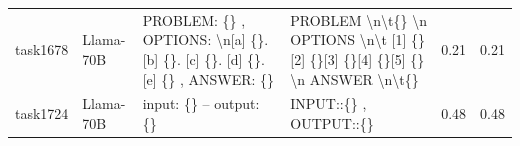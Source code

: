 \begin{longtable}{@{}p{0.8cm\tiny}p{1cm\tiny}p{4.1cm\ttfamily\tiny}p{4.1cm\ttfamily\tiny}p{0.8cm\tiny}p{0.8cm\tiny}@{}}
task1678  & Llama-70B  & PROBLEM: \{\} , OPTIONS: \textbackslash{}n{[}a{]} \{\}. {[}b{]} \{\}. {[}c{]} \{\}. {[}d{]} \{\}. {[}e{]} \{\} , ANSWER: \{\}                                                                                                                                                                                                                                                                                                                                                                                           & PROBLEM \textbackslash{}n\textbackslash{}t\{\} \textbackslash{}n OPTIONS \textbackslash{}n\textbackslash{}t {[}1{]} \{\}{[}2{]} \{\}{[}3{]} \{\}{[}4{]} \{\}{[}5{]} \{\} \textbackslash{}n ANSWER \textbackslash{}n\textbackslash{}t\{\}                                                                                                                                                                                                                                                                                                                                          & 0.21 & 0.21 \\
task1724  & Llama-70B  & input: \{\} -- output: \{\}                                                                                                                                                                                                                                                                                                                                                                                                                                                                                             & INPUT::\{\} ,  OUTPUT::\{\}                                                                                                                                                                                                                                                                                                                                                                                                                                                                                                                                                       & 0.48 & 0.48 \\

\end{longtable}
